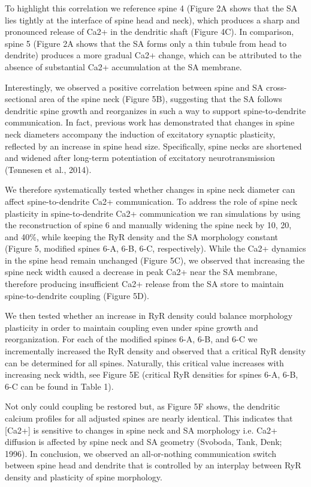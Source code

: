 \documentclass[fleqn,10pt]{wlscirep}
\begin{document}
		To highlight this correlation we reference spine 4 (Figure 2A shows that the SA lies tightly at the interface of spine head and neck), which produces a sharp and pronounced release of Ca2+ in the dendritic shaft (Figure 4C). In comparison, spine 5 (Figure 2A shows that the SA forms only a thin tubule from head to dendrite) produces a more gradual Ca2+ change, which can be attributed to the absence of substantial Ca2+ accumulation at the SA membrane.
		
		Interestingly, we observed a positive correlation between spine and SA cross-sectional area of the spine neck (Figure 5B), suggesting that the SA follows dendritic spine growth and reorganizes in such a way to support spine-to-dendrite communication. In fact, previous work has demonstrated that changes in spine neck diameters accompany the induction of excitatory synaptic plasticity, reflected by an increase in spine head size. Specifically, spine necks are shortened and widened after long-term potentiation of excitatory neurotransmission (Tønnesen et al., 2014). 
		
		We therefore systematically tested whether changes in spine neck diameter can affect spine-to-dendrite Ca2+ communication. To address the role of spine neck plasticity in spine-to-dendrite Ca2+ communication we ran simulations by using the reconstruction of spine 6 and manually widening the spine neck by 10, 20, and 40\%, while keeping the RyR density and the SA morphology constant (Figure 5, modified spines 6-A, 6-B, 6-C, respectively). While the Ca2+ dynamics in the spine head remain unchanged (Figure 5C), we observed that increasing the spine neck width caused a decrease in peak Ca2+ near the SA membrane, therefore producing insufficient Ca2+ release from the SA store to maintain spine-to-dendrite coupling (Figure 5D). 
		
		We then tested whether an increase in RyR density could balance morphology plasticity in order to maintain coupling even under spine growth and reorganization. For each of the modified spines 6-A, 6-B, and 6-C we incrementally increased the RyR density and observed that a critical RyR density can be determined for all spines. Naturally, this critical value increases with increasing neck width, see Figure 5E (critical RyR densities for spines 6-A, 6-B, 6-C can be found in Table 1). 
		
		Not only could coupling be restored but, as Figure 5F shows, the dendritic calcium profiles for all adjusted spines are nearly identical. This indicates that [Ca2+] is sensitive to changes in spine neck and SA morphology i.e. Ca2+ diffusion is affected by spine neck and SA geometry (Svoboda, Tank, Denk; 1996). In conclusion, we observed an all-or-nothing communication switch between spine head and dendrite that is controlled by an interplay between RyR density and plasticity of spine morphology. 
\end{document}
